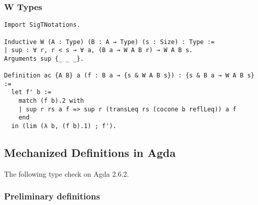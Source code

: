 \documentclass[acmsmall,review,anonymous]{acmart}\settopmatter{printfolios=true,printccs=false,printacmref=false}
\begin{document}
\subsubsection{W Types} \label{app:mechanization:coq:W}

\begin{verbatim}
Import SigTNotations.

Inductive W (A : Type) (B : A → Type) (s : Size) : Type :=
| sup : ∀ r, r < s → ∀ a, (B a → W A B r) → W A B s.
Arguments sup {_ _ _}.

Definition ac {A B} a (f : B a → {s & W A B s}) : {s & B a → W A B s} :=
  let f' b :=
    match (f b).2 with
    | sup r rs a f => sup r (transLeq rs (cocone b reflLeq)) a f
    end
  in (lim (λ b, (f b).1) ; f').
\end{verbatim}

\subsection{Mechanized \CICE Definitions in Agda}

The following type check on Agda 2.6.2.

\subsubsection{Preliminary definitions} \label{app:mechanization:agda:prelim}
\end{document}
